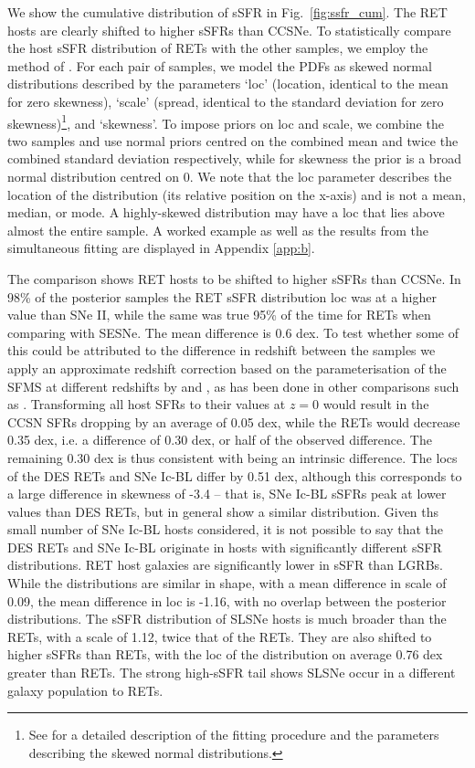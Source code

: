 \documentclass[fleqn,usenatbib,]{mnras}
\newcommand{\replyref}[1]{\color{magenta}#1 \color{black}}
\begin{document}
We show the cumulative distribution of sSFR in Fig.~\ref{fig:ssfr_cum}. The RET hosts are clearly shifted to higher sSFRs than CCSNe. To statistically compare the host sSFR distribution of RETs with the other samples, we employ the method of . For each pair of samples, we model the PDFs as skewed normal distributions described by the parameters `loc' (location, identical to the mean for zero skewness), `scale' (spread, identical to the standard deviation for zero skewness)\footnote{See  for a detailed description of the fitting procedure and the parameters describing the skewed normal distributions.}, and `skewness'. To impose priors on loc and scale, we combine the two samples and use normal priors centred on the combined mean and twice the combined standard deviation respectively, while for skewness the prior is a broad normal distribution centred on 0. We note that the loc parameter describes the location of the distribution (its relative position on the x-axis) and is not a mean, median, or mode. A highly-skewed distribution may have a loc that lies above almost the entire sample. A worked example as well as the results from the simultaneous fitting are displayed in Appendix \ref{app:b}.

The comparison shows RET hosts to be shifted to higher sSFRs than CCSNe. In 98\% of the posterior samples the RET sSFR distribution loc was at a higher value than SNe II, while the same was true 95\% of the time for RETs when comparing with SESNe. The mean difference is 0.6 dex. To test whether some of this could be attributed to the difference in redshift between the samples we apply an approximate redshift correction based on the parameterisation of the SFMS at different redshifts by \citet{Salim2007} and \citet{Noeske2007}, as has been done in other comparisons such as \citet{Taggart2019}. Transforming all host SFRs to their values at $z=0$ would result in the CCSN SFRs dropping by an average of 0.05 dex, while the RETs would decrease 0.35 dex, i.e. a difference of 0.30 dex, or half of the observed difference. The remaining 0.30 dex is thus consistent with being an intrinsic difference. \replyref{The locs of the DES RETs and SNe Ic-BL differ by 0.51 dex, although this corresponds to a large difference in skewness of -3.4 -- that is, SNe Ic-BL sSFRs peak at lower values than DES RETs, but in general show a similar distribution. Given ths small number of SNe Ic-BL hosts considered, it is not possible to say that the DES RETs and SNe Ic-BL originate in hosts with significantly different sSFR distributions.}
RET host galaxies are significantly lower in sSFR than LGRBs. While the distributions are similar in shape, with a mean difference in scale of 0.09, the mean difference in loc is -1.16, with no overlap between the posterior distributions. The sSFR distribution of SLSNe hosts is much broader than the RETs, with a scale of 1.12, twice that of the RETs. They are also shifted to higher sSFRs than RETs, with the loc of the distribution on average 0.76 dex greater than RETs. The strong high-sSFR tail shows SLSNe occur in a different galaxy population to RETs.
\end{document}

